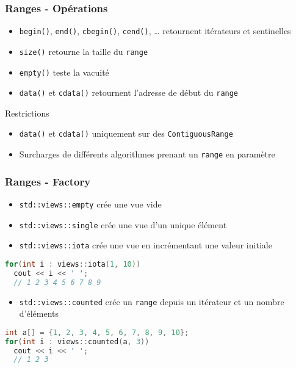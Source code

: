 \documentclass[C++.tex]{subfiles}
\begin{document}
\begin{frame}
	\frametitle{Ranges - Opérations}
	\begin{itemize}
		\item \lstinline|begin()|, \lstinline|end()|, \lstinline|cbegin()|, \lstinline|cend()|, \ldots{} retournent itérateurs et sentinelles
		\item \lstinline|size()| retourne la taille du \lstinline|range|
		\item \lstinline|empty()| teste la vacuité
		\item \lstinline|data()| et \lstinline|cdata()| retournent l'adresse de début du \lstinline|range|
	\end{itemize}

	\begin{alertblock}{Restrictions}
		\begin{itemize}
			\item \lstinline|data()| et \lstinline|cdata()| uniquement sur des \lstinline|ContiguousRange|
		\end{itemize}
	\end{alertblock}

	\begin{itemize}
		\item Surcharges de différents algorithmes prenant un \lstinline|range| en paramètre
	\end{itemize}
\end{frame}

\begin{frame}[fragile]
	\frametitle{Ranges - Factory}
	\begin{itemize}
		\item \lstinline|std::views::empty| crée une vue vide
		\item \lstinline|std::views::single| crée une vue d'un unique élément
		\item \lstinline|std::views::iota| crée une vue en incrémentant une valeur initiale
	\end{itemize}

	\begin{lstlisting}[language=C++]
for(int i : views::iota(1, 10))
  cout << i << ' ';
  // 1 2 3 4 5 6 7 8 9\end{lstlisting}

	\begin{itemize}
		\item \lstinline|std::views::counted| crée un \lstinline|range| depuis un itérateur et un nombre d'éléments
	\end{itemize}

	\begin{lstlisting}[language=C++]
int a[] = {1, 2, 3, 4, 5, 6, 7, 8, 9, 10};
for(int i : views::counted(a, 3))
  cout << i << ' ';
  // 1 2 3\end{lstlisting}
\end{frame}
\end{document}
